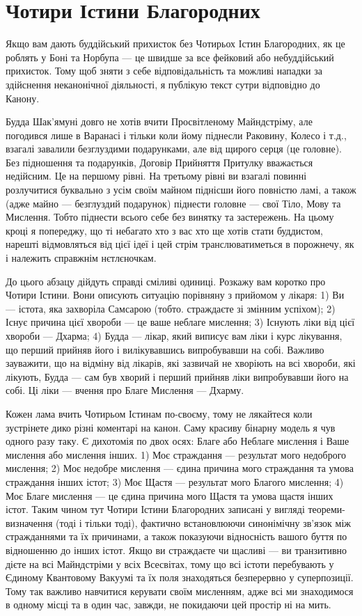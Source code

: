 \section{Чотири Істини Благородних}

Якщо вам дають буддійський прихисток без Чотирьох Істин Благородних,
як це роблять у Боні та Норбупа — це швидше за все фейковий або
небуддійський прихисток. Тому щоб зняти з себе відповідальність
та можливі нападки за здійснення неканонічної діяльності,
я публікую текст сутри відповідно до Канону.

Будда Шак'ямуні довго не хотів вчити Просвітленому Майндстріму,
але погодився лише в Варанасі і тільки коли йому піднесли Раковину,
Колесо і т.д., взагалі завалили безглуздими подарунками,
але від щирого серця (це головне). Без підношення та подарунків,
Договір Прийняття Притулку вважається недійсним. Це на
першому рівні. На третьому рівні ви взагалі повинні розлучитися
буквально з усім своїм майном піднісши його повністю ламі,
а також (адже майно --- безглуздий подарунок) піднести
головне --- свої Тіло, Мову та Мислення. Тобто піднести всього
себе без винятку та застережень. На цьому кроці я попереджу, що
ті небагато хто з вас хто ще хотів стати буддистом, нарешті відмовляться
від цієї ідеї і цей стрім транслюватиметься в порожнечу, як і
належить справжнім нєтлєночкам.

До цього абзацу дійдуть справді сміливі одиниці. Розкажу вам
коротко про Чотири Істини. Вони описують ситуацію порівняну
з прийомом у лікаря: 1) Ви --- істота, яка захворіла Самсарою (тобто.
страждаєте зі змінним успіхом); 2) Існує причина цієї
хвороби --- це ваше неблаге мислення; 3) Існують ліки
від цієї хвороби --- Дхарма; 4) Будда --- лікар, який виписує
вам ліки і курс лікування, що перший прийняв його і вилікувавшись
випробувавши на собі. Важливо зауважити, що на відміну від лікарів,
які зазвичай не хворіють на всі хвороби, які лікують,
Будда --- сам був хворий і перший прийняв ліки випробувавши
його на собі. Ці ліки — вчення про Благе Мислення --- Дхарму.

Кожен лама вчить Чотирьом Істинам по-своєму, тому не лякайтеся
коли зустрінете дико різні коментарі на канон. Саму
красиву бінарну модель я чув одного разу таку. Є дихотомія
по двох осях: Благе або Неблаге мислення і Ваше мислення або
мислення інших. 1) Моє страждання --- результат мого недоброго
мислення; 2) Моє недобре мислення --- єдина причина
мого страждання та умова страждання інших істот; 3)
Моє Щастя --- результат мого Благого мислення; 4) Моє
Благе мислення --- це єдина причина мого Щастя
та умова щастя інших істот. Таким чином тут
Чотири Істини Благородних записані у вигляді теореми-визначення
(тоді і тільки тоді), фактично встановлюючи синонімічну
зв'язок між стражданнями та їх причинами, а також показуючи
відносність вашого буття по відношенню до інших істот.
Якщо ви страждаєте чи щасливі --- ви транзитивно дієте
на всі Майндстріми у всіх Всесвітах, тому що всі істоти
перебувають у Єдиному Квантовому Вакуумі та їх поля знаходяться
безперервно у суперпозиції. Тому так важливо навчитися керувати
своїм мисленням, адже всі ми знаходимося в одному місці та в один
час, завжди, не покидаючи цей простір ні на мить.

